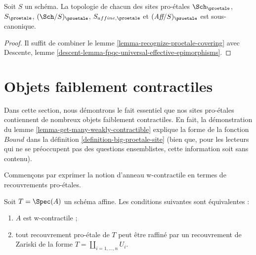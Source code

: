 \begin{lemma}
\label{lemma-proetale-subcanonical}
Soit $S$ un schéma. La topologie de chacun des sites pro-\'etales
$\Sch_\proetale$, $S_\proetale$, $(\Sch/S)_\proetale$,
$S_{affine, \proetale}$ et $(\textit{Aff}/S)_\proetale$ est sous-canonique.
\end{lemma}

\begin{proof}
Il suffit de combiner le lemme \ref{lemma-recognize-proetale-covering} avec
Descente, lemme \ref{descent-lemma-fpqc-universal-effective-epimorphisms}.
\end{proof}





\section{Objets faiblement contractiles}
\label{section-weakly-contractible}

\noindent
Dans cette section, nous démontrons le fait essentiel que nos sites pro-\'etales
contiennent de nombreux objets faiblement contractiles. En fait, la démonstration du
lemme \ref{lemma-get-many-weakly-contractible} explique la forme de la fonction
$Bound$ dans la
définition \ref{definition-big-proetale-site} (bien que, pour les lecteurs
qui ne se préoccupent pas des questions ensemblistes, cette information
soit sans contenu).

\noindent
Commençons par exprimer la notion d'anneau w-contractile en termes de
recouvrements pro-\'etales.

\begin{lemma}
\label{lemma-w-contractible-proetale-cover}
Soit $T = \Spec(A)$ un schéma affine. Les conditions suivantes sont équivalentes :
\begin{enumerate}
\item $A$ est w-contractile ;
\item tout recouvrement pro-\'etale de $T$ peut être raffiné par
un recouvrement de Zariski de la forme $T = \coprod_{i = 1, \ldots, n} U_i$.
\end{enumerate}
\end{lemma}

